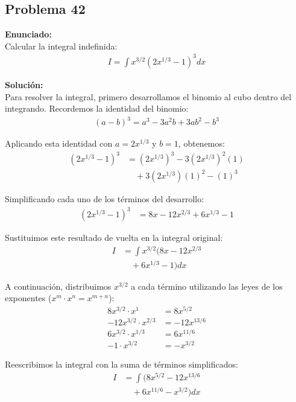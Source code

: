 \subsection*{Problema 42}

\textbf{Enunciado:} \\
Calcular la integral indefinida:
\begin{align*}
I = \int x^{3/2} \left(2x^{1/3} - 1\right)^3 dx
\end{align*}

\textbf{Solución:} \\
Para resolver la integral, primero desarrollamos el binomio al cubo dentro del integrando. 
Recordemos la identidad del binomio:
\begin{align*}
(a - b)^3 = a^3 - 3a^2b + 3ab^2 - b^3
\end{align*}

Aplicando esta identidad con $a = 2x^{1/3}$ y $b = 1$, obtenemos:
\begin{align*}
\left(2x^{1/3} - 1\right)^3 &= (2x^{1/3})^3 - 3(2x^{1/3})^2(1) \\
&\quad + 3(2x^{1/3})(1)^2 - (1)^3
\end{align*}

Simplificando cada uno de los términos del desarrollo:
\begin{align*}
\left(2x^{1/3} - 1\right)^3 &= 8x - 12x^{2/3} + 6x^{1/3} - 1
\end{align*}

Sustituimos este resultado de vuelta en la integral original:
\begin{align*}
I &= \int x^{3/2} \Big(8x - 12x^{2/3} \\
&\quad + 6x^{1/3} - 1\Big) dx
\end{align*}

A continuación, distribuimos $x^{3/2}$ a cada término utilizando las leyes de los exponentes ($x^m \cdot x^n = x^{m+n}$):
\begin{align*}
8x^{3/2} \cdot x^1 &= 8x^{5/2} \\
-12x^{3/2} \cdot x^{2/3} &= -12x^{13/6} \\
6x^{3/2} \cdot x^{1/3} &= 6x^{11/6} \\
-1 \cdot x^{3/2} &= -x^{3/2}
\end{align*}

Reescribimos la integral con la suma de términos simplificados:
\begin{align*}
I &= \int \Big( 8x^{5/2} - 12x^{13/6} \\
&\quad + 6x^{11/6} - x^{3/2} \Big) dx
\end{align*}

